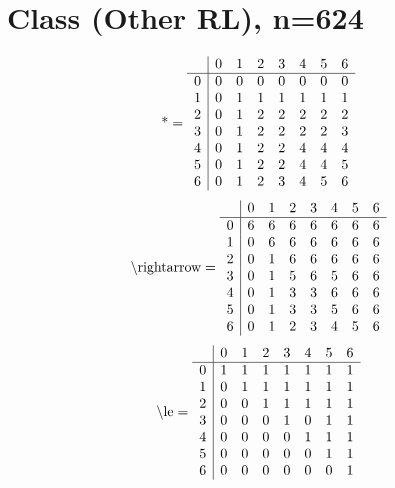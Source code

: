 \documentclass[11pt]{article}
\begin{document}
\section{Class (Other RL), n=624}
\[\text{*} = 
\begin{array}{r | r r r r r r r}
 & 0 & 1 & 2 & 3 & 4 & 5 & 6 \\ \hline
0 & 0 & 0 & 0 & 0 & 0 & 0 & 0 \\
1 & 0 & 1 & 1 & 1 & 1 & 1 & 1 \\
2 & 0 & 1 & 2 & 2 & 2 & 2 & 2 \\
3 & 0 & 1 & 2 & 2 & 2 & 2 & 3 \\
4 & 0 & 1 & 2 & 2 & 4 & 4 & 4 \\
5 & 0 & 1 & 2 & 2 & 4 & 4 & 5 \\
6 & 0 & 1 & 2 & 3 & 4 & 5 & 6 \\
\end{array}
\]
\[\text{\textbackslash rightarrow} = 
\begin{array}{r | r r r r r r r}
 & 0 & 1 & 2 & 3 & 4 & 5 & 6 \\ \hline
0 & 6 & 6 & 6 & 6 & 6 & 6 & 6 \\
1 & 0 & 6 & 6 & 6 & 6 & 6 & 6 \\
2 & 0 & 1 & 6 & 6 & 6 & 6 & 6 \\
3 & 0 & 1 & 5 & 6 & 5 & 6 & 6 \\
4 & 0 & 1 & 3 & 3 & 6 & 6 & 6 \\
5 & 0 & 1 & 3 & 3 & 5 & 6 & 6 \\
6 & 0 & 1 & 2 & 3 & 4 & 5 & 6 \\
\end{array}
\]
\[\text{\textbackslash le} = 
\begin{array}{r | r r r r r r r}
 & 0 & 1 & 2 & 3 & 4 & 5 & 6 \\ \hline
0 & 1 & 1 & 1 & 1 & 1 & 1 & 1 \\
1 & 0 & 1 & 1 & 1 & 1 & 1 & 1 \\
2 & 0 & 0 & 1 & 1 & 1 & 1 & 1 \\
3 & 0 & 0 & 0 & 1 & 0 & 1 & 1 \\
4 & 0 & 0 & 0 & 0 & 1 & 1 & 1 \\
5 & 0 & 0 & 0 & 0 & 0 & 1 & 1 \\
6 & 0 & 0 & 0 & 0 & 0 & 0 & 1 \\
\end{array}
\]
\end{document}
